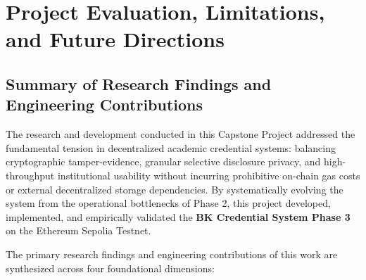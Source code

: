 
\chapter{Project Evaluation, Limitations, and Future Directions}

\section{Summary of Research Findings and Engineering Contributions}

The research and development conducted in this Capstone Project addressed the fundamental tension in decentralized academic credential systems: balancing cryptographic tamper-evidence, granular selective disclosure privacy, and high-throughput institutional usability without incurring prohibitive on-chain gas costs or external decentralized storage dependencies. By systematically evolving the system from the operational bottlenecks of Phase 2, this project developed, implemented, and empirically validated the \textbf{BK Credential System Phase 3} on the Ethereum Sepolia Testnet.

The primary research findings and engineering contributions of this work are synthesized across four foundational dimensions:

